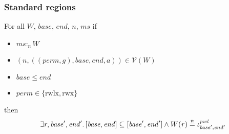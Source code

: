 \documentclass[a4paper]{article}
\newcommand{\nequal}[1][n]{\stackrel{\tiny{#1}}{=}}
\newcommand{\var}[1]{\mathit{#1}}
\newcommand{\hs}{\var{ms}}
\newcommand{\ms}{\hs}
\newcommand{\gl}{\var{g}}
\newcommand{\addr}{\var{a}}
\newcommand{\start}{\var{base}}
\newcommand{\addrend}{\var{end}}
\newcommand{\heap}{\var{mem}}
\newcommand{\perm}{\var{perm}}
\newcommand{\stdcap}[1][(\perm,\gl)]{\left(#1,\start,\addrend,\addr \right)}
\newcommand{\pwl}{\var{pwl}}
\newcommand{\heapSat}[3][\heap]{#1 :_{#2} #3}
\newcommand{\memSat}[3][n]{\heapSat[#2]{#1}{#3}}
\newcommand{\asmType}{\plaindom{AsmType}}
\newcommand{\plaindom}[1]{\mathrm{#1}}
\newcommand{\intr}[2]{\mathcal{#1}}
\newcommand{\valueintr}[1]{\intr{V}{#1}}
\newcommand{\stdvr}{\valueintr{\asmType}}
\newcommand{\npair}[2][n]{\left(#1,#2 \right)}
\newcommand{\plainperm}[1]{\mathrm{#1}}
\newcommand{\rwx}{\plainperm{rwx}}
\newcommand{\rwlx}{\plainperm{rwlx}}
\begin{document}
\subsubsection{Standard regions}

\begin{lemma}
  \label{lem:pwl-stack}
  For all $W$, $\start$, $\addrend$, $n$, $\ms$ if
  \begin{itemize}
  \item $\memSat{\ms}{W}$
  \item $\npair{\stdcap} \in \stdvr(W)$
  \item $\start \leq \addrend$
  \item $\perm \in \{ \rwlx, \rwx \}$
  \end{itemize}
  then
  \[
    \exists r, \start',\addrend' \ldotp [\start,\addrend] \subseteq [\start',\addrend'] \land W(\var{r}) \nequal \iota^\pwl_{\start',\addrend'}
  \]
\end{lemma}
\end{document}

